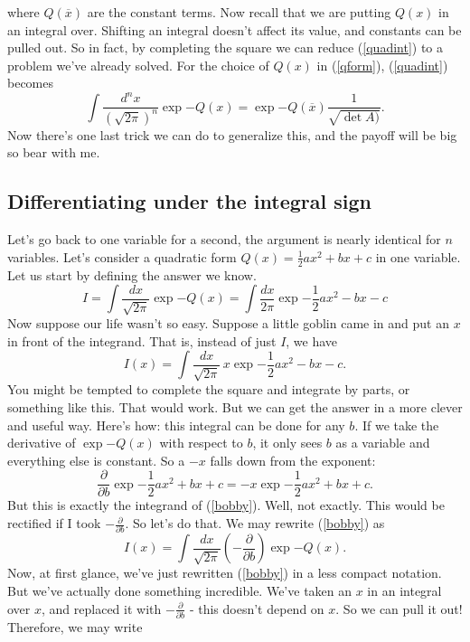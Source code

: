 \documentclass{book}
\begin{document}
where $Q(\overline{x})$ are the constant terms. Now recall that we are putting $Q(x)$ in an integral over. Shifting an integral doesn't affect its value, and constants can be pulled out. So in fact, by completing the square we can reduce (\ref{quadint}) to a problem we've already solved. For the choice of $Q(x)$ in (\ref{qform}), (\ref{quadint}) becomes
\begin{equation} \label{cts}
\int \frac{d^n x}{(\sqrt{2\pi})^n} \exp{-Q(x)} = \exp{-Q(\overline{x})} \frac{1}{\sqrt{\det A)}}.
\end{equation}
Now there's one last trick we can do to generalize this, and the payoff will be big so bear with me. 

\newpage
\subsection{Differentiating under the integral sign}
Let's go back to one variable for a second, the argument is nearly identical for $n$ variables. Let's consider a quadratic form $Q(x) = \frac{1}{2} ax^2 + bx + c$ in one variable. Let us start by defining the answer we know.
\[
I = \int \frac{dx}{\sqrt{2\pi}} \exp{-Q(x)} = \int \frac{dx}{2\pi} \exp{-\frac{1}{2}ax^2 - bx - c}
\]
Now suppose our life wasn't so easy. Suppose a little goblin came in and put an $x$ in front of the integrand. That is, instead of just $I$, we have
\begin{equation} \label{bobby}
I (x) = \int \frac{dx}{\sqrt{2\pi}} \, x \exp{-\frac{1}{2} a x^2 - bx - c}. 
\end{equation}
You might be tempted to complete the square and integrate by parts, or something like this. That would work. But we can get the answer in a more clever and useful way. Here's how: this integral can be done for any $b$. If we take the derivative of $\exp{-Q(x)}$ with respect to $b$, it only sees $b$ as a variable and everything else is constant. So a $-x$ falls down from the exponent:
\[
\frac{\partial}{\partial b} \exp{-\frac{1}{2}ax^2 + bx + c} = - x \exp{-\frac{1}{2} ax^2 + bx + c}.
\]
But this is exactly the integrand of (\ref{bobby}). Well, not exactly. This would be rectified if I took $-\frac{\partial}{\partial b}$. So let's do that. We may rewrite (\ref{bobby}) as 
\begin{equation}
I (x) = \int \frac{dx}{\sqrt{2\pi}} \left(-\frac{\partial}{\partial b}\right) \exp{-Q(x)}.
\end{equation}
Now, at first glance, we've just rewritten (\ref{bobby}) in a less compact notation. But we've actually done something incredible. We've taken an $x$ in an integral over $x$, and replaced it with $-\frac{\partial}{\partial b}$ - this doesn't depend on $x$. So we can pull it out! Therefore, we may write
\end{document}
